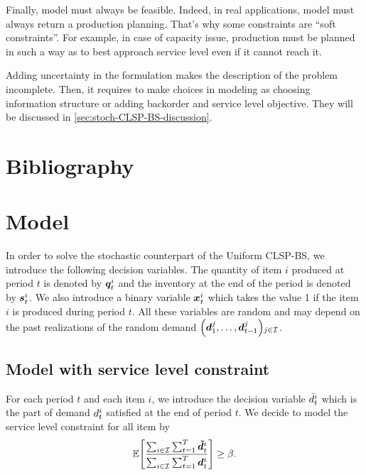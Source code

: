 Finally, model must always be feasible.
Indeed, in real applications, model must always return a production planning.
That's why some constraints are ``soft constraints''.
For example, in case of capacity issue, production must be planned in such a way as to best approach service level even if it cannot reach it.


\medskip

Adding uncertainty in the formulation makes the description of the problem incomplete.
Then, it requires to make choices in modeling as choosing information structure or adding backorder and service level objective.
They will be discussed in \cref{sec:stoch-CLSP-BS-discussion}.


\medskip


\section{Bibliography}
\label{sec:PDP:stochastic:bibliography}




\section{Model}
\label{sec:PDP:stochastic:model}

In order to solve the stochastic counterpart of the Uniform CLSP-BS, we introduce the following decision variables.
The quantity of item $i$ produced at period $t$ is denoted by $\va\quantity_t^i$ and the inventory at the end of the period is denoted by $\va\inventory_t^i$.
We also introduce a binary variable $\va\setup_t^i$ which takes the value 1 if the item $i$ is produced during period $t$.
All these variables are random and may depend on the past realizations of the random demand $\bracket{\va\demand_1^j,\ldots,\va\demand_{t-1}^j}_{j\in\REF}$.


\subsection{Model with service level constraint}

For each period $t$ and each item $i$, we introduce the decision variable $\tilde{d}_t^i$ which is the part of demand $d_t^i$ satisfied at the end of period $t$.
We decide to model the service level constraint for all item by
\begin{equation}
  \label{eq:service-level-constraint}
  \espe\sqbracket{ \frac{\sum_{i\in\REF}\sum_{t=1}^{\horizon}\va\supplied_t^i}{\sum_{i\in\REF}\sum_{t=1}^{\horizon}\va\demand_t^i} }
  \geq \servicelvl.
\end{equation}

